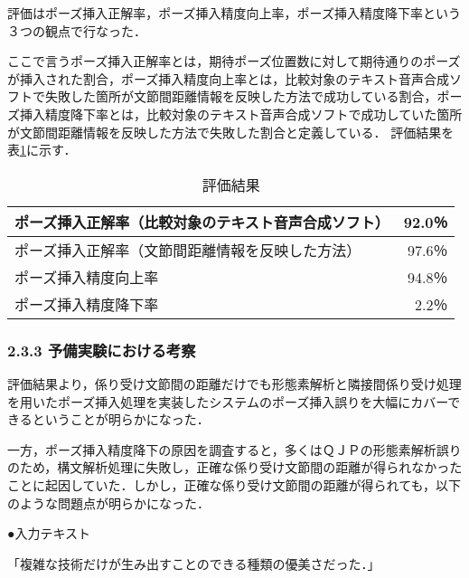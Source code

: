 評価はポーズ挿入正解率，ポーズ挿入精度向上率，ポーズ挿入精度降下率という３つの観点で行なった．

ここで言うポーズ挿入正解率とは，期待ポーズ位置数に対して期待通りのポーズが挿入された割合，ポーズ挿入精度向上率とは，比較対象のテキスト音声合成ソフトで失敗した箇所が文節間距離情報を反映した方法で成功している割合，ポーズ挿入精度降下率とは，比較対象のテキスト音声合成ソフトで成功していた箇所が文節間距離情報を反映した方法で失敗した割合と定義している．
評価結果を表\ref{tab:yhyoka}に示す．

\vspace{0.2cm}
\begin{table}[hbtp]
\caption[評価結果]{評価結果}
\label{tab:yhyoka}
\begin{center}
\begin{tabular}{|l|r|} \hline
ポーズ挿入正解率（比較対象のテキスト音声合成ソフト） & 92.0％  \\ \hline
ポーズ挿入正解率（文節間距離情報を反映した方法）  & 97.6％  \\ \hline
ポーズ挿入精度向上率  &  94.8％  \\ \hline
ポーズ挿入精度降下率  &   2.2％  \\ 
\hline
\end{tabular}
\end{center}
\end{table}
\vspace{0.2cm}

\subsubsection{2.3.3 \hspace{5mm}予備実験における考察}

評価結果より，係り受け文節間の距離だけでも形態素解析と隣接間係り受け処理を用いたポーズ挿入処理を実装したシステムのポーズ挿入誤りを大幅にカバーできるということが明らかになった．

一方，ポーズ挿入精度降下の原因を調査すると，多くはＱＪＰの形態素解析誤りのため，構文解析処理に失敗し，正確な係り受け文節間の距離が得られなかったことに起因していた．しかし，正確な係り受け文節間の距離が得られても，以下のような問題点が明らかになった．

\vspace{0.2cm}

\hspace*{0.5cm}●入力テキスト

\hspace*{1cm}「複雑な技術だけが生み出すことのできる種類の優美さだった．」
\vspace{0.2cm}

